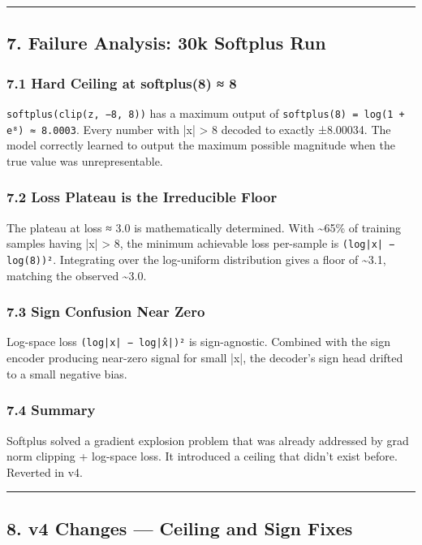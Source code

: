 \documentclass[11pt]{article}
\begin{document}
\noindent\rule{\textwidth}{0.4pt}


\subsection*{7. Failure Analysis: 30k Softplus Run}


\subsubsection*{7.1 Hard Ceiling at softplus(8) ≈ 8}


\texttt{softplus(clip(z, −8, 8))} has a maximum output of \texttt{softplus(8) = log(1 + e⁸) ≈ 8.0003}. Every number with |x| > 8 decoded to exactly ±8.00034. The model correctly learned to output the maximum possible magnitude when the true value was unrepresentable.


\subsubsection*{7.2 Loss Plateau is the Irreducible Floor}


The plateau at loss ≈ 3.0 is mathematically determined. With \textasciitilde{}65\% of training samples having |x| > 8, the minimum achievable loss per-sample is \texttt{(log|x| − log(8))²}. Integrating over the log-uniform distribution gives a floor of \textasciitilde{}3.1, matching the observed \textasciitilde{}3.0.


\subsubsection*{7.3 Sign Confusion Near Zero}


Log-space loss \texttt{(log|x| − log|x̂|)²} is sign-agnostic. Combined with the sign encoder producing near-zero signal for small |x|, the decoder's sign head drifted to a small negative bias.


\subsubsection*{7.4 Summary}


Softplus solved a gradient explosion problem that was already addressed by grad norm clipping + log-space loss. It introduced a ceiling that didn't exist before. Reverted in v4.


\noindent\rule{\textwidth}{0.4pt}


\subsection*{8. v4 Changes — Ceiling and Sign Fixes}
\end{document}
